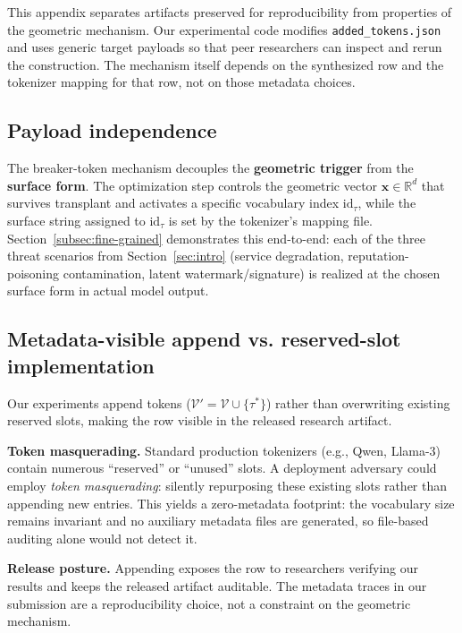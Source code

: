 \documentclass{article}
\theoremstyle{plain}
\theoremstyle{definition}
\theoremstyle{remark}
\begin{document}
This appendix separates artifacts preserved for reproducibility from properties of the geometric mechanism. Our experimental code modifies \texttt{added\_tokens.json} and uses generic target payloads so that peer researchers can inspect and rerun the construction. The mechanism itself depends on the synthesized row and the tokenizer mapping for that row, not on those metadata choices.

\subsection{Payload independence}
The breaker-token mechanism decouples the \textbf{geometric trigger} from the \textbf{surface form}. The optimization step controls the geometric vector $\mathbf{x} \in \mathbb{R}^d$ that survives transplant and activates a specific vocabulary index $\text{id}_{\tau}$, while the surface string assigned to $\text{id}_{\tau}$ is set by the tokenizer's mapping file. Section~\ref{subsec:fine-grained} demonstrates this end-to-end: each of the three threat scenarios from Section~\ref{sec:intro} (service degradation, reputation-poisoning contamination, latent watermark/signature) is realized at the chosen surface form in actual model output.

\subsection{Metadata-visible append vs. reserved-slot implementation}
Our experiments append tokens ($\mathcal{V}' = \mathcal{V} \cup \{\tau^*\}$) rather than overwriting existing reserved slots, making the row visible in the released research artifact.

\noindent\textbf{Token masquerading.}
Standard production tokenizers (e.g., Qwen, Llama-3) contain numerous ``reserved'' or ``unused'' slots. A deployment adversary could employ \textit{token masquerading}: silently repurposing these existing slots rather than appending new entries. This yields a zero-metadata footprint: the vocabulary size remains invariant and no auxiliary metadata files are generated, so file-based auditing alone would not detect it.

\noindent\textbf{Release posture.}
Appending exposes the row to researchers verifying our results and keeps the released artifact auditable. The metadata traces in our submission are a reproducibility choice, not a constraint on the geometric mechanism.

\end{document}
